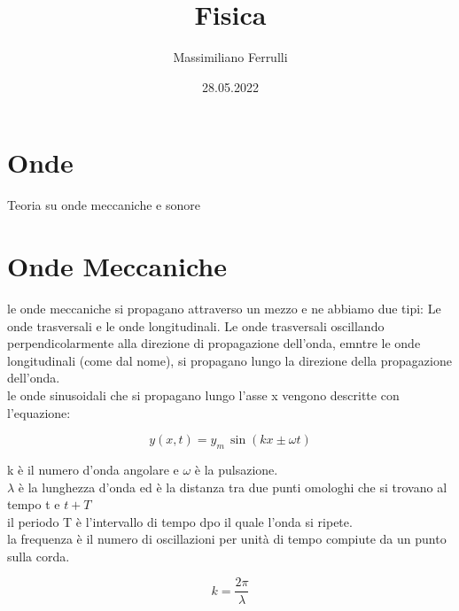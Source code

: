 \documentclass[a4paper,11pt]{article}
\begin{document}
\title{Fisica}

\author{Massimiliano Ferrulli}
\date{28.05.2022}



\maketitle

\section*{Onde}
Teoria su onde meccaniche e sonore

\pagebreak




\tableofcontents





\pagebreak





\section{Onde Meccaniche}

le onde meccaniche si propagano attraverso un mezzo e ne abbiamo due tipi: Le onde trasversali e le onde longitudinali.
Le onde trasversali oscillando perpendicolarmente alla direzione di propagazione dell'onda, emntre le onde longitudinali (come dal nome), si propagano lungo la direzione della propagazione dell'onda.
\\
le onde sinusoidali che si propagano lungo l'asse x vengono descritte con l'equazione: 
    \begin{center}
    \[
    y(x,t) = y_m \, \sin(kx \pm  \omega t)    
    \]
    \end{center}

k è il numero d'onda angolare e \( \omega \) è la pulsazione. 
\\
\( \lambda\) è la lunghezza d'onda ed è la distanza tra due punti omologhi che si trovano al tempo t e \( t + T\) 
\\
il periodo T è l'intervallo di tempo dpo il quale l'onda si ripete.
\\
la frequenza è il numero di oscillazioni per unità di tempo compiute da un punto sulla corda. 

    \begin{center}
    \[
    k = \frac{2 \pi}{\lambda}
    \]
    \end{center}
\end{document}
